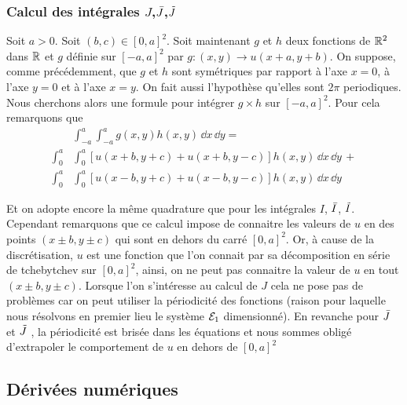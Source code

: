 \documentclass[10pt]{article}
\begin{document}
\begin{multicols}{2}
\vspace*{11pt}




\subsubsection{Calcul des intégrales $J$,$\bar{J}$,$\tilde{J}$ }

Soit $a>0$. Soit $(b,c) \in [0,a]^2$. Soit maintenant $g$ et $h$ deux fonctions de $\mathbb{R}^2$ dans $\mathbb{R}$ et  $g$ définie sur $[-a, a]^2$  par $g : (x,y) \rightarrow u(x+a, y+b)$. On suppose, comme précédemment, que $g$ et $h$ sont symétriques par rapport à l'axe $x=0$, à l'axe $y=0$ et à l'axe $x=y$. On fait aussi l'hypothèse qu'elles sont $2\pi$ periodiques. Nous cherchons alors une formule pour intégrer $g\times h$ sur $[-a, a]^2$. Pour cela remarquons que
\begin{equation}
\begin{split}
 & \int_{-a}^{a} \int_{-a}^{a} g(x,y) h(x,y) \,  \dd x \, \dd y  = \\
 \int_{0}^{a} & \int_{0}^{a} [u(x+b, y+c) + u(x+b, y-c)] h(x,y) \, \dd x \, \dd y \, + \\ 
\int_{0}^{a} & \int_{0}^{a} [u(x-b, y+c) + u(x-b, y-c)] h(x,y)  \, \dd x \, \dd y 
\end{split}
\end{equation}

Et on adopte encore la même quadrature que pour les intégrales $I$, $\bar{I}$, $\tilde{I}$. Cependant remarquons que ce calcul impose de connaitre les valeurs de $u$ en des points $(x \pm b, y\pm c)$ qui sont en dehors du carré $[0, a]^2$. Or, à cause de la discrétisation, $u$ est une fonction que l'on connait par sa décomposition en série de tchebytchev sur $[0,a]^2$, ainsi, on ne peut pas connaitre la valeur de $u$ en tout $(x\pm b, y\pm c)$. Lorsque l'on s'intéresse au calcul de $J$ cela ne pose pas de problèmes car on peut utiliser la périodicité des fonctions (raison pour laquelle nous résolvons en premier lieu le système $\mathcal{E}_1$ dimensionné). En revanche pour $\bar{J}$ et $\tilde{J}$ , la périodicité est brisée dans les équations et nous sommes obligé d'extrapoler le comportement de $u$ en dehors de $[0,a]^2$





\subsection{Dérivées numériques}


\end{multicols}
\end{document}
